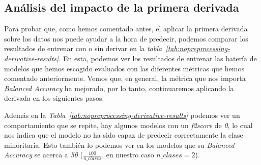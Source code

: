 \subsection{Análisis del impacto de la primera derivada}

Para probar que, como hemos comentado antes, el aplicar la primera derivada sobre los datos nos puede ayudar a la hora de predecir, podemos comparar los resultados de entrenar con o sin derivar en la \textit{tabla\ \ref{tab:nopreprocessing-derivative-results}}. En esta, podemos ver los resultados de entrenar las batería de modelos que hemos escogido evaluados con las diferentes métricas que hemos comentado anteriormente. Vemos que, en general, la métrica que nos importa \textit{Balanced Accuracy} ha mejorado, por lo tanto, continuaremos aplicando la derivada en los siguientes pasos.

Además en la \textit{Tabla\ \ref{tab:nopreprocessing-derivative-results}} podemos ver un comportamiento que se repite, hay algunos modelos con un \textit{f2score} de \textit{0}, lo cual nos indica que el modelo no ha sido capaz de predecir correctamente la clase minoritaria. Esto también lo podemos ver en los modelos que su \textit{Balanced Accuracy} se acerca a \textit{50} ($\frac{100}{n\_clases}$, en nuestro caso $n\_clases=2$).



